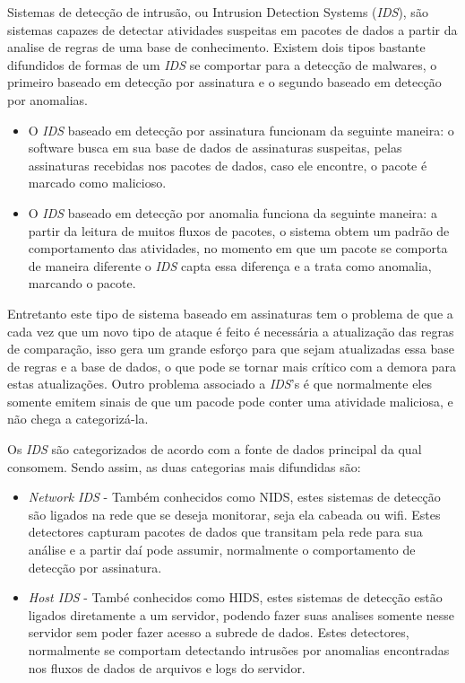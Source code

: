 
Sistemas de detecção de intrusão, ou Intrusion Detection Systems (\textit{IDS}), são sistemas capazes de detectar atividades suspeitas em pacotes de dados a partir da analise de regras de uma base de conhecimento. Existem dois tipos bastante difundidos de formas de um \textit{IDS} se comportar para a detecção de malwares, o primeiro baseado em detecção por assinatura e o segundo baseado em detecção por anomalias.

\begin{itemize}
    \item O \textit{IDS} baseado em detecção por assinatura funcionam da seguinte maneira: o software busca em sua base de dados de assinaturas suspeitas, pelas assinaturas recebidas nos pacotes de dados, caso ele encontre, o pacote é marcado como malicioso. \cite{rehman2003intrusion}
    \item O \textit{IDS} baseado em detecção por anomalia funciona da seguinte maneira: a partir da leitura de muitos fluxos de pacotes, o sistema obtem um padrão de comportamento das atividades, no momento em que um pacote se comporta de maneira diferente o \textit{IDS} capta essa diferença e a trata como anomalia, marcando o pacote. \cite{debar2000introduction}
\end{itemize}


Entretanto este tipo de sistema baseado em assinaturas tem o problema de que a cada vez que um novo tipo de ataque é feito é necessária a atualização das regras de comparação, isso gera um grande esforço para que sejam atualizadas essa base de regras e a base de dados, o que pode se tornar mais crítico com a demora para estas atualizações. Outro problema associado a \textit{IDS}'s é que normalmente eles somente emitem sinais de que um pacode pode conter uma atividade maliciosa, e não chega a categorizá-la.

Os \textit{IDS} são categorizados de acordo com a fonte de dados principal da qual consomem. Sendo assim, as duas categorias mais difundidas são:
\begin{itemize}
    \item \textit{Network IDS} - Também conhecidos como NIDS, estes sistemas de detecção são ligados na rede que se deseja monitorar, seja ela cabeada ou wifi. Estes detectores capturam pacotes de dados que transitam pela rede para sua análise e a partir daí pode assumir, normalmente o comportamento de detecção por assinatura.
    \item \textit{Host IDS} -  També conhecidos como HIDS, estes sistemas de detecção estão ligados diretamente a um servidor, podendo fazer suas analises somente nesse servidor sem poder fazer acesso a subrede de dados. Estes detectores, normalmente se comportam detectando intrusões por anomalias encontradas nos fluxos de dados de arquivos e logs do servidor. \cite{rehman2003intrusion}
\end{itemize}